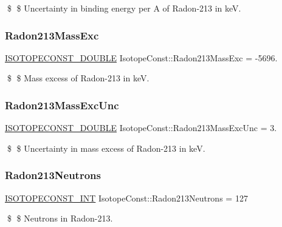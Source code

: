 \$ \$ Uncertainty in binding energy per A of Radon-\/213 in keV. \mbox{\label{group___isotope_const-_radon-_rn213_ga8fd4dec502fd3ebe78403333fdc0f279}} 
\subsubsection{\texorpdfstring{Radon213\+Mass\+Exc}{Radon213MassExc}}
{\footnotesize\ttfamily \mbox{\hyperlink{group___isotope_const-_macros_ga8f45a7272ce02c0b4c65c44636ed719a}{I\+S\+O\+T\+O\+P\+E\+C\+O\+N\+S\+T\+\_\+\+D\+O\+U\+B\+LE}} Isotope\+Const\+::\+Radon213\+Mass\+Exc = -\/5696.}

\$ \$ Mass excess of Radon-\/213 in keV. \mbox{\label{group___isotope_const-_radon-_rn213_ga5ca3d1d332866d0ec3239fdc9c23de10}} 
\subsubsection{\texorpdfstring{Radon213\+Mass\+Exc\+Unc}{Radon213MassExcUnc}}
{\footnotesize\ttfamily \mbox{\hyperlink{group___isotope_const-_macros_ga8f45a7272ce02c0b4c65c44636ed719a}{I\+S\+O\+T\+O\+P\+E\+C\+O\+N\+S\+T\+\_\+\+D\+O\+U\+B\+LE}} Isotope\+Const\+::\+Radon213\+Mass\+Exc\+Unc = 3.}

\$ \$ Uncertainty in mass excess of Radon-\/213 in keV. \mbox{\label{group___isotope_const-_radon-_rn213_gaae2b88ca2604ce43ff69ec151e8ffb5c}} 
\subsubsection{\texorpdfstring{Radon213\+Neutrons}{Radon213Neutrons}}
{\footnotesize\ttfamily \mbox{\hyperlink{group___isotope_const-_macros_ga5f18360b3e99483a35c32d789e62621c}{I\+S\+O\+T\+O\+P\+E\+C\+O\+N\+S\+T\+\_\+\+I\+NT}} Isotope\+Const\+::\+Radon213\+Neutrons = 127}

\$ \$ Neutrons in Radon-\/213. \mbox{\label{group___isotope_const-_radon-_rn213_ga0533143cfefee18deee7688be164bba7}} 
